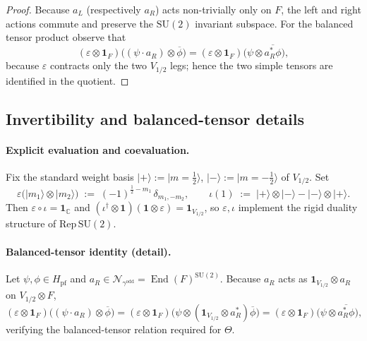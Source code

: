\documentclass[11pt]{article}
\begin{document}
\begin{proof}
Because $a_L$ (respectively $a_R$) acts non-trivially only on $F$,
the left and right actions commute and preserve the $\mathrm{SU}(2)$
invariant subspace.  For the balanced tensor product observe that
\[
  (\varepsilon\!\otimes\!\mathbf1_F)
   \bigl((\psi\cdot a_R)\otimes\overline\phi\bigr)
  =(\varepsilon\!\otimes\!\mathbf1_F)
   \bigl(\psi\otimes\overline{a_R^{*}\phi}\bigr),
\]
because $\varepsilon$ contracts only the two $V_{1/2}$ legs; hence the
two simple tensors are identified in the quotient.
\end{proof}

\subsection*{Invertibility and balanced-tensor details}

\paragraph{Explicit evaluation and coevaluation.}
Fix the standard weight basis
$|+\rangle:=|m=\tfrac12\rangle$, $|-\rangle:=|m=-\tfrac12\rangle$ of
$V_{1/2}$.
Set
\[
  \varepsilon\bigl(|m_1\rangle\!\otimes|m_2\rangle\bigr)
  \;:=\;
  (-1)^{\tfrac12-m_1}\,\delta_{m_1,-m_2},
  \qquad
  \iota(1)
  \;:=\;
  |+\rangle\!\otimes|-\rangle-|-\rangle\!\otimes|+\rangle.
\]
Then $\varepsilon\circ\iota=\mathbf1_{\mathbb C}$ and
$(\iota^\dagger\!\otimes\!\mathbf1)(\mathbf1\!\otimes\!\varepsilon)
   =\mathbf1_{V_{1/2}}$, so $\varepsilon,\iota$ implement the rigid duality
structure of $\mathrm{Rep}\,\mathrm{SU}(2)$.

\paragraph{Balanced-tensor identity (detail).}
Let
$\psi,\phi\in H_{\mathrm{pf}}$ and
$a_R\in\mathcal N_{\gamma^{\mathrm{odd}}}=\operatorname{End}(F)^{\mathrm{SU}(2)}$.
Because $a_R$ acts as $\mathbf1_{V_{1/2}}\!\otimes a_R$ on
$V_{1/2}\!\otimes F$,
\[
  (\varepsilon\!\otimes\!\mathbf1_F)\bigl((\psi\cdot a_R)\otimes\overline\phi\bigr)
  =(\varepsilon\!\otimes\!\mathbf1_F)\bigl(\psi\otimes
      (\mathbf1_{V_{1/2}}\!\otimes a_R^{*})\overline\phi\bigr)
  =(\varepsilon\!\otimes\!\mathbf1_F)\bigl(\psi\otimes\overline{a_R^{*}\phi}\bigr),
\]
verifying the balanced-tensor relation required for $\Theta$.
\end{document}
